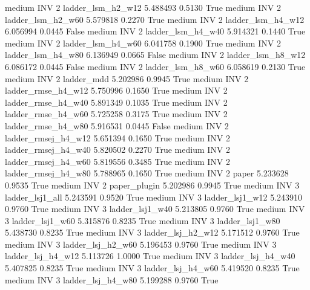     medium      INV                 2   ladder_lsm_h2_w12   5.488493      0.5130    True
    medium      INV                 2   ladder_lsm_h2_w60   5.579818      0.2270    True
    medium      INV                 2   ladder_lsm_h4_w12   6.056994      0.0445   False
    medium      INV                 2   ladder_lsm_h4_w40   5.914321      0.1440    True
    medium      INV                 2   ladder_lsm_h4_w60   6.041758      0.1900    True
    medium      INV                 2   ladder_lsm_h4_w80   6.136949      0.0665   False
    medium      INV                 2   ladder_lsm_h8_w12   6.086172      0.0445   False
    medium      INV                 2   ladder_lsm_h8_w60   6.058619      0.2130    True
    medium      INV                 2          ladder_mdd   5.202986      0.9945    True
    medium      INV                 2  ladder_rmse_h4_w12   5.750996      0.1650    True
    medium      INV                 2  ladder_rmse_h4_w40   5.891349      0.1035    True
    medium      INV                 2  ladder_rmse_h4_w60   5.725258      0.3175    True
    medium      INV                 2  ladder_rmse_h4_w80   5.916531      0.0445   False
    medium      INV                 2 ladder_rmsej_h4_w12   5.651394      0.1650    True
    medium      INV                 2 ladder_rmsej_h4_w40   5.820502      0.2270    True
    medium      INV                 2 ladder_rmsej_h4_w60   5.819556      0.3485    True
    medium      INV                 2 ladder_rmsej_h4_w80   5.788965      0.1650    True
    medium      INV                 2               paper   5.233628      0.9535    True
    medium      INV                 2        paper_plugin   5.202986      0.9945    True
    medium      INV                 3     ladder_lsj1_all   5.243591      0.9520    True
    medium      INV                 3     ladder_lsj1_w12   5.243910      0.9760    True
    medium      INV                 3     ladder_lsj1_w40   5.213805      0.9760    True
    medium      INV                 3     ladder_lsj1_w60   5.315876      0.8235    True
    medium      INV                 3     ladder_lsj1_w80   5.438730      0.8235    True
    medium      INV                 3   ladder_lsj_h2_w12   5.171512      0.9760    True
    medium      INV                 3   ladder_lsj_h2_w60   5.196453      0.9760    True
    medium      INV                 3   ladder_lsj_h4_w12   5.113726      1.0000    True
    medium      INV                 3   ladder_lsj_h4_w40   5.407825      0.8235    True
    medium      INV                 3   ladder_lsj_h4_w60   5.419520      0.8235    True
    medium      INV                 3   ladder_lsj_h4_w80   5.199288      0.9760    True
